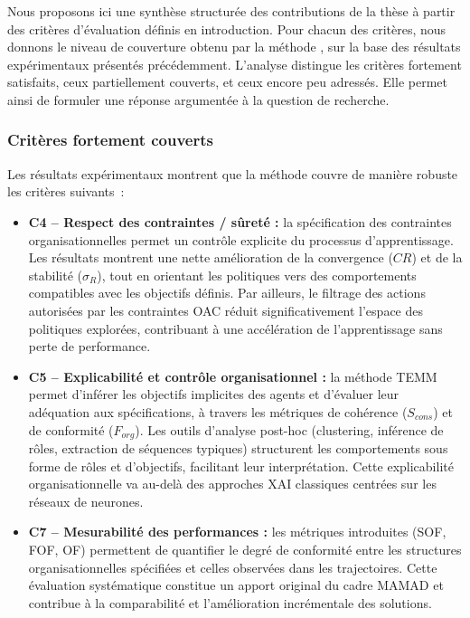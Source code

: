 \noindent
Nous proposons ici une synthèse structurée des contributions de la thèse à partir des critères d’évaluation définis en introduction. Pour chacun des critères, nous donnons le niveau de couverture obtenu par la méthode , sur la base des résultats expérimentaux présentés précédemment. L’analyse distingue les critères fortement satisfaits, ceux partiellement couverts, et ceux encore peu adressés. Elle permet ainsi de formuler une réponse argumentée à la question de recherche.

\subsubsection*{Critères fortement couverts}

Les résultats expérimentaux montrent que la méthode couvre de manière robuste les critères suivants~:

\begin{itemize}
    \item \textbf{C4 – Respect des contraintes / sûreté :} la spécification des contraintes organisationnelles permet un contrôle explicite du processus d’apprentissage. Les résultats montrent une nette amélioration de la convergence ($CR$) et de la stabilité ($\sigma_R$), tout en orientant les politiques vers des comportements compatibles avec les objectifs définis. Par ailleurs, le filtrage des actions autorisées par les contraintes OAC réduit significativement l’espace des politiques explorées, contribuant à une accélération de l’apprentissage sans perte de performance.

    \item \textbf{C5 – Explicabilité et contrôle organisationnel :} la méthode TEMM permet d’inférer les objectifs implicites des agents et d’évaluer leur adéquation aux spécifications, à travers les métriques de cohérence ($S_{cons}$) et de conformité ($F_{org}$). Les outils d’analyse post-hoc (clustering, inférence de rôles, extraction de séquences typiques) structurent les comportements sous forme de rôles et d’objectifs, facilitant leur interprétation. Cette explicabilité organisationnelle va au-delà des approches XAI classiques centrées sur les réseaux de neurones.

    \item \textbf{C7 – Mesurabilité des performances :} les métriques introduites (SOF, FOF, OF) permettent de quantifier le degré de conformité entre les structures organisationnelles spécifiées et celles observées dans les trajectoires. Cette évaluation systématique constitue un apport original du cadre MAMAD et contribue à la comparabilité et l’amélioration incrémentale des solutions.
\end{itemize}

